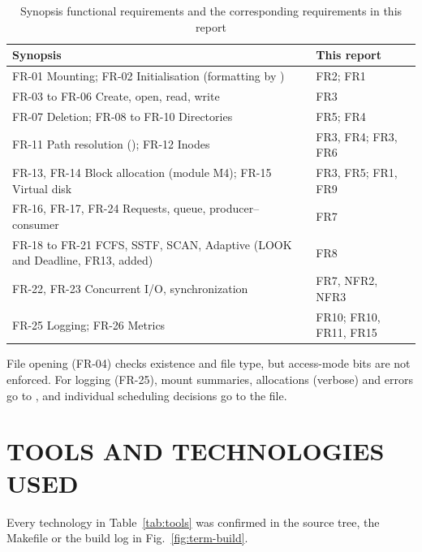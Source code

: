 \documentclass[12pt,a4paper]{article}
\DeclareRobustCommand{\code}[1]{\texttt{\detokenize{#1}}}
\newcommand{\figref}[1]{Fig.~\ref{#1}}
\newcommand{\tabref}[1]{Table~\ref{#1}}
\begin{document}
\begin{table}[!htbp]
\centering
\caption[Synopsis functional requirements mapped to this report]{Synopsis functional requirements and the corresponding requirements in this report}
\label{tab:synfr}
\small
\begin{tabularx}{\linewidth}{@{}X l@{}}
\toprule
\textbf{Synopsis} & \textbf{This report} \\
\midrule
FR-01 Mounting; FR-02 Initialisation (formatting by \code{mkfs.schedfs}) & FR2; FR1 \\
FR-03 to FR-06 Create, open, read, write & FR3 \\
FR-07 Deletion; FR-08 to FR-10 Directories & FR5; FR4 \\
FR-11 Path resolution (\code{resolve()}); FR-12 Inodes & FR3, FR4; FR3, FR6 \\
FR-13, FR-14 Block allocation (module M4); FR-15 Virtual disk & FR3, FR5; FR1, FR9 \\
FR-16, FR-17, FR-24 Requests, queue, producer--consumer & FR7 \\
FR-18 to FR-21 FCFS, SSTF, SCAN, Adaptive (LOOK and Deadline, FR13, added) & FR8 \\
FR-22, FR-23 Concurrent I/O, synchronization & FR7, NFR2, NFR3 \\
FR-25 Logging; FR-26 Metrics & FR10; FR10, FR11, FR15 \\
\bottomrule
\end{tabularx}
\end{table}

\noindent File opening (FR-04) checks existence and file type, but access-mode bits are not enforced. For logging (FR-25), mount summaries, allocations (verbose) and errors go to \code{filesystem.log}, and individual scheduling decisions go to the \code{--trace} file.

\renewcommand{\thesubsection}{\thesection.\arabic{subsection}}
\section{TOOLS AND TECHNOLOGIES USED}
Every technology in \tabref{tab:tools} was confirmed in the source tree, the Makefile or the build log in \figref{fig:term-build}.
\end{document}
